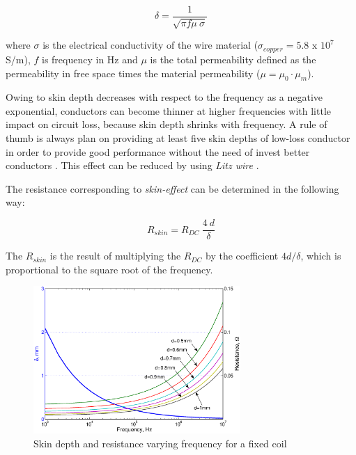 \begin{equation}
\delta = \frac{1}{\sqrt{\pi{f}\mu\:\sigma}}
\end{equation}

where $\sigma$ is the electrical conductivity of the wire material ($\sigma_{copper}=5.8 \text{ x } 10^7$ S/m), $f$ is frequency in Hz and $\mu$ is the total permeability defined as the permeability in free space times the material permeability ($\mu=\mu_0\cdot{\mu_m}$). 

Owing to skin depth decreases with respect to the frequency as a negative exponential, conductors can become thinner at higher frequencies with little impact on circuit loss, because skin depth shrinks with frequency. A rule of thumb is always plan on providing at least five skin depths of low-loss conductor in order to provide good performance without the need of invest better conductors \cite{skinDepth}. This effect can be reduced by using \textit{Litz wire} \cite{ACres}.

The resistance corresponding to  \textit{skin-effect} can be determined in the following way:

\begin{equation}
R_{skin}=R_{DC}\:\frac{4\:d}{\delta}
\end{equation}

The $R_{skin}$ is the result of multiplying the $R_{DC}$ by the coefficient $4d/\delta$, which is proportional to the square root of the frequency.

\begin{figure}[htb]
\begin{center}
\includegraphics[width=0.7\textwidth]{./images/skinDepth}
\caption{Skin depth and resistance varying frequency for a fixed coil}
\label{F:skinDepth}
\end{center}
\end{figure}

